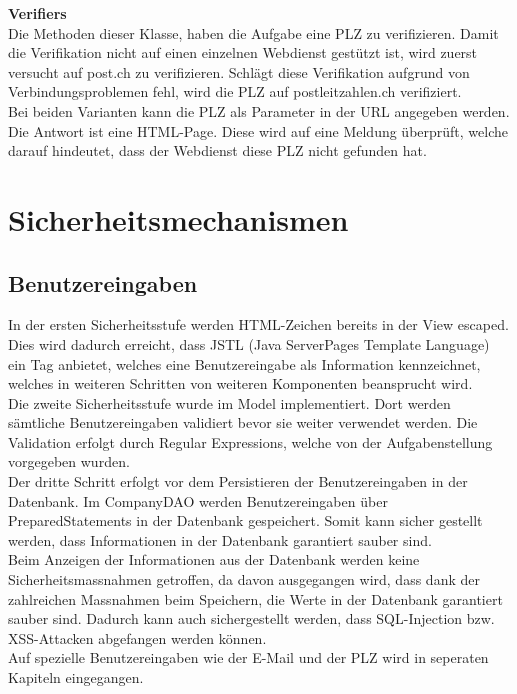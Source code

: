\documentclass[12pt]{scrartcl}
\begin{document}
\textbf{Verifiers}\\
Die Methoden dieser Klasse, haben die Aufgabe eine PLZ zu verifizieren. Damit die Verifikation nicht auf einen einzelnen Webdienst gestützt ist, wird zuerst versucht auf post.ch zu verifizieren. Schlägt diese Verifikation aufgrund von Verbindungsproblemen fehl, wird die PLZ auf postleitzahlen.ch verifiziert.\\
Bei beiden Varianten kann die PLZ als Parameter in der URL angegeben werden. Die Antwort ist eine HTML-Page. Diese wird auf eine Meldung überprüft, welche darauf hindeutet, dass der Webdienst diese PLZ nicht gefunden hat.

\section{Sicherheitsmechanismen}
\subsection{Benutzereingaben}
In der ersten Sicherheitsstufe werden HTML-Zeichen bereits in der View escaped. Dies wird dadurch erreicht, dass JSTL (Java ServerPages Template Language) ein Tag anbietet, welches eine Benutzereingabe als Information kennzeichnet, welches in weiteren Schritten von weiteren Komponenten beansprucht wird.\\
Die zweite Sicherheitsstufe wurde im Model implementiert. Dort werden sämtliche Benutzereingaben validiert bevor sie weiter verwendet werden. Die Validation erfolgt durch Regular Expressions, welche von der Aufgabenstellung vorgegeben wurden.\\
Der dritte Schritt erfolgt vor dem Persistieren der Benutzereingaben in der Datenbank. Im CompanyDAO werden Benutzereingaben über PreparedStatements in der Datenbank gespeichert. Somit kann sicher gestellt werden, dass Informationen in der Datenbank garantiert sauber sind.\\
Beim Anzeigen der Informationen aus der Datenbank werden keine Sicherheitsmassnahmen getroffen, da davon ausgegangen wird, dass dank der zahlreichen Massnahmen beim Speichern, die Werte in der Datenbank garantiert sauber sind. Dadurch kann auch sichergestellt werden, dass SQL-Injection bzw. XSS-Attacken abgefangen werden können.\\
Auf spezielle Benutzereingaben wie der E-Mail und der PLZ wird in seperaten Kapiteln eingegangen.
\end{document}
